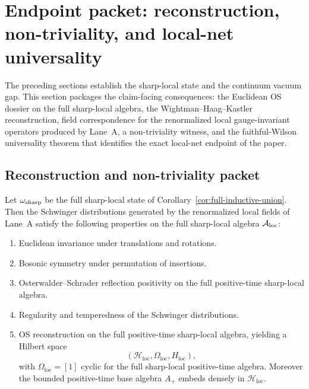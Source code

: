\section{Endpoint packet: reconstruction, non-triviality, and local-net universality}\label{sec:endpoint}

The preceding sections establish the sharp-local state and the continuum vacuum gap. This section packages the claim-facing consequences: the Euclidean OS dossier on the full sharp-local algebra, the Wightman--Haag--Kastler reconstruction, field correspondence for the renormalized local gauge-invariant operators produced by Lane~A, a non-triviality witness, and the faithful-Wilson universality theorem that identifies the exact local-net endpoint of the paper.

\subsection{Reconstruction and non-triviality packet}

\begin{theorem}\label{thm:euclidean-os-dossier}
Let $\omega_{\mathrm{sharp}}$ be the full sharp-local state of Corollary~\ref{cor:full-inductive-union}. Then the Schwinger distributions generated by the renormalized local fields of Lane~A satisfy the following properties on the full sharp-local algebra $\mathcal{A}_{\mathrm{loc}}$:
\begin{enumerate}[label=\textup{(\roman*)},leftmargin=2.25em]
\item Euclidean invariance under translations and rotations.
\item Bosonic symmetry under permutation of insertions.
\item Osterwalder--Schrader reflection positivity on the full positive-time sharp-local algebra.
\item Regularity and temperedness of the Schwinger distributions.
\item OS reconstruction on the full positive-time sharp-local algebra, yielding a Hilbert space
\[
(\mathcal H_{\mathrm{loc}},\Omega_{\mathrm{loc}},H_{\mathrm{loc}}),
\]
with $\Omega_{\mathrm{loc}}=[1]$ cyclic for the full sharp-local positive-time algebra. Moreover the bounded positive-time base algebra $A_+$ embeds densely in $\mathcal H_{\mathrm{loc}}$.
\end{enumerate}
\end{theorem}

